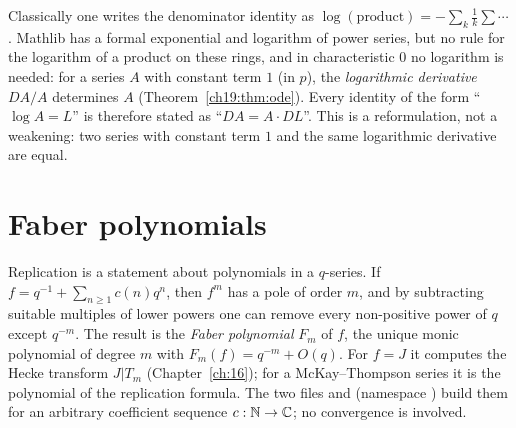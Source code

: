 \begin{remark}\label{ch19:rem:logfree}
Classically one writes the denominator identity as $\log(\text{product})=-\sum_{k}\frac1k\sum\cdots$.  Mathlib has a
formal exponential and logarithm of power series, but no rule for the logarithm of a product on these rings, and in
characteristic $0$ no logarithm is needed: for a series $A$ with
constant term $1$ (in $p$), the \emph{logarithmic derivative} $DA/A$ determines $A$ (Theorem~\ref{ch19:thm:ode}).
Every identity of the form ``$\log A=L$'' is therefore stated as ``$DA=A\cdot DL$''.  This is a reformulation, not a
weakening: two series with constant term $1$ and the same logarithmic derivative are equal.
\end{remark}

\section{Faber polynomials}\label{ch19:sec:faber}

Replication is a statement about polynomials in a $q$-series.  If $f=q^{-1}+\sum_{n\ge1}c(n)q^n$, then $f^m$ has a pole
of order $m$, and by subtracting suitable multiples of lower powers one can remove every non-positive power of $q$
except $q^{-m}$.  The result is the \emph{Faber polynomial} $F_m$ of $f$, the unique monic polynomial of degree $m$ with
$F_m(f)=q^{-m}+O(q)$.  For $f=J$ it computes the Hecke transform $J|T_m$ (Chapter~\ref{ch:16}); for a McKay--Thompson
series it is the polynomial of the replication formula.  The two files 
and  (namespace ) build them
for an arbitrary coefficient sequence $c:{\mathbb{N}}\to{\mathbb{C}}$; no convergence is involved.

